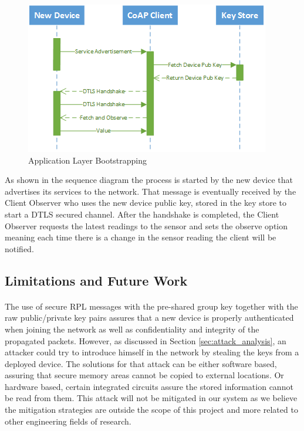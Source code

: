 \begin{figure}[h]
  \centering
  \includegraphics[width=0.8\linewidth]{figures/Sequence_Application_Admission.png}
  \caption{Application Layer Bootstrapping}
  \label{fig:sequence_application_admission}
\end{figure}

As shown in the sequence diagram the process is started by the new device that advertises its services to the network. That message is eventually received by the Client Observer who uses the new device public key, stored in the key store to start a \ac{DTLS} secured channel. After the handshake is completed, the Client Observer requests the latest readings to the sensor and sets the observe option meaning each time there is a change in the sensor reading the client will be notified.

\subsection{Limitations and Future Work}
\paragraph{}

The use of secure RPL messages with the pre-shared group key together with the raw public/private key pairs assures that a new device is properly authenticated when joining the network as well as confidentiality and integrity of the propagated packets. However, as discussed in Section \ref{sec:attack_analysis}, an attacker could try to introduce himself in the network by stealing the keys from a deployed device. The solutions for that attack can be either software based, assuring that secure memory areas cannot be copied to external locations. Or hardware based, certain integrated circuits assure the stored information cannot be read from them. This attack will not be mitigated in our system as we believe the mitigation strategies are outside the scope of this project and more related to other engineering fields of research.\\